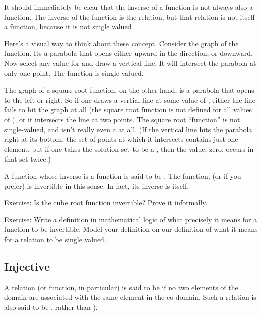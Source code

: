 \documentclass[letterpaper,10pt,english]{sphinxmanual}
\begin{document}
It should immediately be clear that the inverse of a function is not
always also a function. The inverse of the  function is the
 relation, but that relation is not itself a function,
because it is not single valued.

Here’s a visual way to think about these concept. Consider the graph
of the  function. Its a parabola that opens either upward in
the  direction, or downward. Now select any value for  and draw
a vertical line. It will intersect the parabola at only one point.
The function is single-valued.

The graph of a square root function, on the other hand, is a parabola
that opens to the left or right. So if one draws a vertial line at
some value of , either the line fails to hit the graph at all (the
square root function is not defined for all values of ), or it
intersects the line at two points. The square root “function” is not
single-valued, and isn’t really even a  at all. (If the
vertical line hits the parabola right at its bottom, the set of points
at which it intersects contains just one element, but if one takes the
solution set to be a , then the value, zero, occurs in that
set twice.)

A function whose inverse is a function is said to be .
The function,  (or  if you prefer) is invertible in
this sense. In fact, its inverse is itself.

Exercise: Is the cube root function invertible? Prove it informally.

Exercise: Write a definition in mathematical logic of what precisely
it means for a function to be invertible. Model your definition on our
definition of what it means for a relation to be single valued.


\subsection{Injective}
\label{\detokenize{07-set-theory:injective}}
A relation (or function, in particular) is said to be  if
no two elements of the domain are associated with the same element in
the co-domain. Such a relation is also said to be ,
rather than ).
\end{document}
